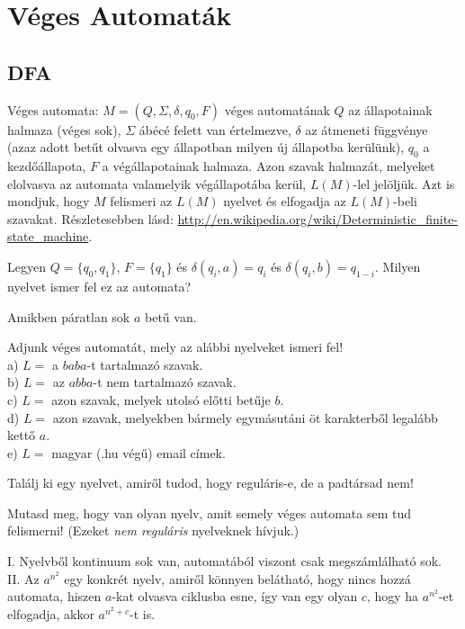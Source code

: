 \chapter{V\'eges Automat\'ak}

\section{DFA}

 Véges automata: $M=(Q,\Sigma,\delta,q_0,F)$ véges automatának $Q$ az állapotainak halmaza (véges sok), $\Sigma$ ábécé felett van értelmezve, $\delta$ az átmeneti függvénye (azaz adott betűt olvasva egy állapotban milyen új állapotba kerülünk), $q_0$ a kezdőállapota, $F$ a végállapotainak halmaza. Azon szavak halmazát, melyeket elolvasva az automata valamelyik végállapotába kerül, $L(M)$-lel jelöljük. Azt is mondjuk, hogy $M$ felismeri az $L(M)$ nyelvet \'es elfogadja az $L(M)$-beli szavakat.
R\'eszletesebben l\'asd: \url{http://en.wikipedia.org/wiki/Deterministic_finite-state_machine}. 

\begin{Exercise}[counter={sorszam}, difficulty=0]
	Legyen $Q=\{q_0,q_1\}$, $F=\{q_1\}$ és $\delta(q_i,a)=q_i$ és $\delta(q_i,b)=q_{1-i}$. Milyen nyelvet ismer fel ez az automata?
\end{Exercise}
\begin{Answer}
	Amikben p\'aratlan sok $a$ bet\H u van.
\end{Answer}

\begin{Exercise}[counter={sorszam}, difficulty=0]
	Adjunk véges automatát, mely az alábbi nyelveket ismeri fel!\\
	a) $L=$ a $baba$-t tartalmazó szavak.\\
	b) $L=$ az $abba$-t nem tartalmazó szavak.\\
	c) $L=$ azon szavak, melyek utolsó előtti betűje $b$.\\
	d) $L=$ azon szavak, melyekben bármely egymásutáni öt karakterből legalább kettő $a$.\\
	e) $L=$ magyar (.hu v\'eg\H u) email c\'imek.
\end{Exercise}


\begin{Exercise}[counter={sorszam}, difficulty=0]
	Tal\'alj ki egy nyelvet, amir\H ol tudod, hogy regul\'aris-e, de a padt\'arsad nem!
\end{Exercise}


\begin{Exercise}[counter={sorszam}, difficulty=0]
	Mutasd meg, hogy van olyan nyelv, amit semely véges automata sem tud felismerni! (Ezeket {\em nem reguláris} nyelveknek hívjuk.)
\end{Exercise}	 
\begin{Answer}
	I. Nyelvb\H ol kontinuum sok van, automat\'ab\'ol viszont csak megsz\'aml\'alhat\'o sok.\\
	II. Az $a^{n^2}$ egy konkr\'et nyelv, amir\H ol k\"onnyen bel\'athat\'o, hogy nincs hozz\'a automata, hiszen $a$-kat olvasva ciklusba esne, \'igy van egy olyan $c$, hogy ha $a^{n^2}$-et elfogadja, akkor $a^{n^2+c}$-t is.
\end{Answer}


